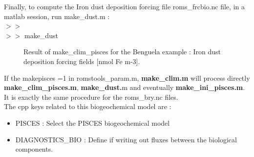 \noindent Finally, to compute the Iron dust deposition forcing file roms\_frcbio.nc file, in a matlab session,  run make\_dust.m :\\
$>>$\\
$>>$ make\_dust\\
\begin{figure}[!htbp]
\centering
{}%
\hfill
\caption{Result of make\_clim\_pisces for the Benguela example : Iron dust deposition
  forcing fields [nmol Fe m-3].}
\label{fig:makeclimpiscesNO4}
\end{figure}

If the makepisces =1 in romstools\_param.m,   \textbf{make\_clim.m} will process directly  \textbf{make\_clim\_pisces.m}, \textbf{make\_dust.}m and eventually \textbf{make\_ini\_pisces.m}.
It is exactly the same procedure for the roms\_bry.nc files. \\

The cpp keys related to this biogeochemical model are :
\begin{itemize}
\item PISCES : Select the PISCES biogeochemical model
\item DIAGNOSTICS\_BIO : Define if writing out fluxes between the biological
components. \\
\end{itemize}
